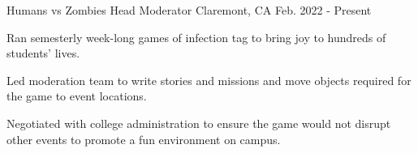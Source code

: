 

\begin{cventries}

  \cventry
    {Humans vs Zombies} %
    {Head Moderator} %
    {Claremont, CA} %
    {Feb. 2022 - Present} %
    {
    \begin{cvitems}
      \item{
      Ran semesterly week-long games of infection tag to bring joy to hundreds of students' lives.
      \item{
      Led moderation team to write stories and missions and move objects required for the game to event locations.
      }
      \item{
      Negotiated with college administration to ensure the game would not disrupt other events to promote a fun environment on campus.
      }
      }
    \end{cvitems}
    }

\end{cventries}
